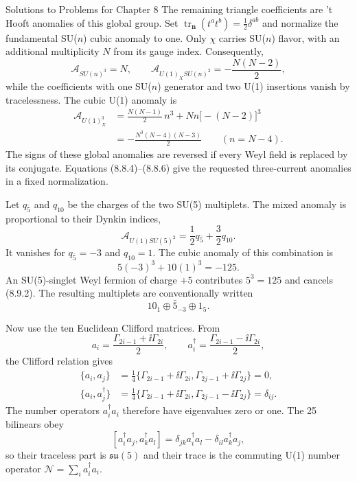 \begin{bankssolutions}{Solutions to Problems for Chapter 8}
The remaining triangle coefficients are 't Hooft anomalies of this global
group.  Set $\operatorname{tr}_{\boldsymbol n}(t^at^b)=\frac12\delta^{ab}$
and normalize the fundamental SU($n$) cubic anomaly to one.  Only $\chi$
carries SU($n$) flavor, with an additional multiplicity $N$ from its gauge
index.  Consequently,
\[
  \mathcal A_{SU(n)^3}=N,
  \qquad
  \mathcal A_{U(1)_XSU(n)^2}
    =-\frac{N(N-2)}2,
  \tag{8.8.6}
\]
while the coefficients with one SU($n$) generator and two U(1) insertions
vanish by tracelessness.  The cubic U(1) anomaly is
\begin{align*}
  \mathcal A_{U(1)_X^3}
    &=\frac{N(N-1)}2\,n^3+Nn\bigl[-(N-2)\bigr]^3\\
    &=-\frac{N^3(N-4)(N-3)}2
    \qquad (n=N-4).
\end{align*}
The signs of these global anomalies are reversed if every Weyl field is
replaced by its conjugate.  Equations (8.8.4)--(8.8.6) give the requested
three-current anomalies in a fixed normalization.

Let $q_{\bar5}$ and $q_{10}$ be the charges of the two SU(5) multiplets.
The mixed anomaly is proportional to their Dynkin indices,
\[
  \mathcal A_{U(1)SU(5)^2}
  =\frac12q_{\bar5}+\frac32q_{10}.
  \tag{8.9.1}
\]
It vanishes for $q_{\bar5}=-3$ and $q_{10}=1$.  The cubic anomaly of this
combination is
\[
  5(-3)^3+10(1)^3=-125 .
  \tag{8.9.2}
\]
An SU(5)-singlet Weyl fermion of charge $+5$ contributes $5^3=125$ and
cancels (8.9.2).  The resulting multiplets are conventionally written
\[
  10_{1}\oplus\bar5_{-3}\oplus1_{5} .
  \tag{8.9.3}
\]

Now use the ten Euclidean Clifford matrices.  From
\[
  a_i=\frac{\Gamma_{2i-1}+\ii\Gamma_{2i}}{2},
  \qquad
  a_i^\dagger=\frac{\Gamma_{2i-1}-\ii\Gamma_{2i}}{2},
\]
the Clifford relation gives
\begin{align*}
  \{a_i,a_j\}
   &=\frac14\{\Gamma_{2i-1}+\ii\Gamma_{2i},
              \Gamma_{2j-1}+\ii\Gamma_{2j}\}=0,\\
  \{a_i,a_j^\dagger\}
   &=\frac14\{\Gamma_{2i-1}+\ii\Gamma_{2i},
              \Gamma_{2j-1}-\ii\Gamma_{2j}\}=\delta_{ij}.
  \tag{8.9.4}
\end{align*}
The number operators $a_i^\dagger a_i$ therefore have eigenvalues zero or
one.  The 25 bilinears obey
\[
  [a_i^\dagger a_j,a_k^\dagger a_l]
   =\delta_{jk}a_i^\dagger a_l-\delta_{il}a_k^\dagger a_j,
  \tag{8.9.5}
\]
so their traceless part is $\mathfrak{su}(5)$ and their trace is the commuting
U(1) number operator $\mathcal N=\sum_i a_i^\dagger a_i$.


\end{bankssolutions}
